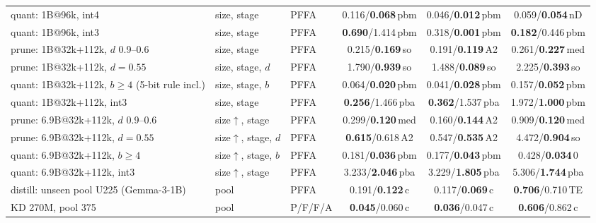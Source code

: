 \begin{table}[H]
\begin{tabular}{@{}>{\raggedright\arraybackslash}p{4.15cm}>{\raggedright\arraybackslash}p{1.4cm}lccc@{}}
\addlinespace[1.5pt]
quant: 1B@96k, int4 & size, stage & PFFA & 0.116/\textbf{0.068}{\scriptsize\,pbm} & 0.046/\textbf{0.012}{\scriptsize\,pbm} & 0.059/\textbf{0.054}{\scriptsize\,nD} \\
quant: 1B@96k, int3 & size, stage & PFFA & \textbf{0.690}/1.414{\scriptsize\,pbm} & 0.318/\textbf{0.001}{\scriptsize\,pbm} & \textbf{0.182}/0.446{\scriptsize\,pbm} \\
\addlinespace[1.5pt]
prune: 1B@32k+112k, $d$ 0.9--0.6 & size, stage & PFFA & 0.215/\textbf{0.169}{\scriptsize\,so} & 0.191/\textbf{0.119}{\scriptsize\,A2} & 0.261/\textbf{0.227}{\scriptsize\,med} \\
prune: 1B@32k+112k, $d=0.55$ & size, stage, $d$ & PFFA & 1.790/\textbf{0.939}{\scriptsize\,so} & 1.488/\textbf{0.089}{\scriptsize\,so} & 2.225/\textbf{0.393}{\scriptsize\,so} \\
\addlinespace[1.5pt]
quant: 1B@32k+112k, $b\ge4$ (5-bit rule incl.) & size, stage, $b$ & PFFA & 0.064/\textbf{0.020}{\scriptsize\,pbm} & 0.041/\textbf{0.028}{\scriptsize\,pbm} & 0.157/\textbf{0.052}{\scriptsize\,pbm} \\
quant: 1B@32k+112k, int3 & size, stage & PFFA & \textbf{0.256}/1.466{\scriptsize\,pba} & \textbf{0.362}/1.537{\scriptsize\,pba} & 1.972/\textbf{1.000}{\scriptsize\,pbm} \\
\addlinespace[1.5pt]
prune: 6.9B@32k+112k, $d$ 0.9--0.6 & size$\uparrow$, stage & PFFA & 0.299/\textbf{0.120}{\scriptsize\,med} & 0.160/\textbf{0.144}{\scriptsize\,A2} & 0.909/\textbf{0.120}{\scriptsize\,med} \\
prune: 6.9B@32k+112k, $d=0.55$ & size$\uparrow$, stage, $d$ & PFFA & \textbf{0.615}/0.618{\scriptsize\,A2} & 0.547/\textbf{0.535}{\scriptsize\,A2} & 4.472/\textbf{0.904}{\scriptsize\,so} \\
\addlinespace[1.5pt]
quant: 6.9B@32k+112k, $b\ge4$ & size$\uparrow$, stage, $b$ & PFFA & 0.181/\textbf{0.036}{\scriptsize\,pbm} & 0.177/\textbf{0.043}{\scriptsize\,pbm} & 0.428/\textbf{0.034}{\scriptsize\,0} \\
quant: 6.9B@32k+112k, int3 & size$\uparrow$, stage & PFFA & 3.233/\textbf{2.046}{\scriptsize\,pba} & 3.229/\textbf{1.805}{\scriptsize\,pba} & 5.306/\textbf{1.744}{\scriptsize\,pba} \\
\addlinespace[1.5pt]
distill: unseen pool U225 (Gemma-3-1B) & pool & PFFA & 0.191/\textbf{0.122}{\scriptsize\,c} & 0.117/\textbf{0.069}{\scriptsize\,c} & \textbf{0.706}/0.710{\scriptsize\,TE} \\
\addlinespace[1.5pt]
KD 270M, pool 375 & pool & P/F/F/A & \textbf{0.045}/0.060{\scriptsize\,c} & \textbf{0.036}/0.047{\scriptsize\,c} & \textbf{0.606}/0.862{\scriptsize\,c} \\

\end{tabular}
\end{table}
